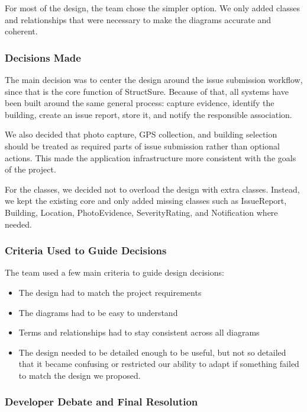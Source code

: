 \documentclass[12pt]{article}
\begin{document}
For most of the design, the team chose the simpler option. We only added classes and relationships that were necessary to make the diagrams accurate and coherent.

\subsubsection{Decisions Made}

The main decision was to center the design around the issue submission workflow, since that is the core function of StructSure. Because of that, all systems have been built around the same general process: capture evidence, identify the building, create an issue report, store it, and notify the responsible association.

We also decided that photo capture, GPS collection, and building selection should be treated as required parts of issue submission rather than optional actions. This made the application infrastructure more consistent with the goals of the project.

For the classes, we decided not to overload the design with extra classes. Instead, we kept the existing core and only added missing classes such as IssueReport, Building, Location, PhotoEvidence, SeverityRating, and Notification where needed.

\subsubsection{Criteria Used to Guide Decisions}

The team used a few main criteria to guide design decisions:
\begin{itemize}
    \item The design had to match the project requirements
    \item The diagrams had to be easy to understand
    \item Terms and relationships had to stay consistent across all diagrams
    \item The design needed to be detailed enough to be useful, but not so detailed that it became confusing or restricted our ability to adapt if something failed to match the design we proposed.
\end{itemize}

\subsubsection{Developer Debate and Final Resolution}
\end{document}
